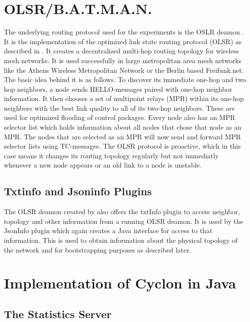 \section{OLSR/B.A.T.M.A.N.} %
The underlying routing protocol used for the experiments is the OSLR deamon
\cite{Tonnesen2004}.
It is the implementation of the optimized link state routing protocol (OLSR) as
described in \cite{RFC3626}. It creates a decentralized multi-hop routing topology for
wireless mesh networks. It is used successfully in large metropolitan area mesh
networks like the Athens Wireless Metropolitan Network or the Berlin based Freifunk.net.
The basic idea behind it is as follows. To discover its immediate one-hop and
two hop neighbors, a node sends HELLO-messages paired with one-hop neighbor
information. It then chooses a set of multipoint relays (MPR) within its one-hop
neighbors with the best link quality to all of its two-hop neighbors. These are
used for optimized flooding of control packages. Every node also has an MPR
selector list which holds information about all nodes that chose that node
as an MPR. The nodes that are selected as an MPR will now send and forward MPR
selector lists using TC-messages. The OLSR protocol is proactive, which in this
case means it changes its routing topology regularly but not immediatly whenever
a new node appears or an old link to a node is unstable.

\subsection{Txtinfo and Jsoninfo Plugins}
The OLSR deamon created by \cite{Tonnesen2004} also offers the txtInfo plugin
\cite{} to access neighbor, topology and other information from a running OLSR
deamon. It is used by the JsonInfo plugin \cite{} which again creates a Java
interface for access to that information. This is used to obtain information
about the physical topology of the network and for bootstrapping purposes as
described later.

\section{Implementation of Cyclon in Java} %

\subsection{The Statistics Server}

